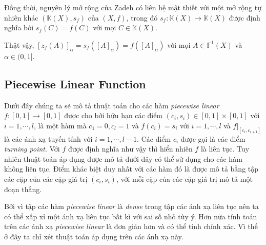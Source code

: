 \documentclass[../report.tex]{subfiles}
\begin{document}
Đồng thời, nguyên lý mở rộng của Zadeh có liên hệ mật thiết với 
một mở rộng tự nhiên khác $(\mathbb{K}(X), s_f)$ của $(X, f)$, trong đó
$s_f: \mathbb{K}(X) \rightarrow \mathbb{K}(X)$ được định nghĩa bởi 
$s_f(C) = f(C)$ với mọi $C \in \mathbb{K}(X)$.

Thật vậy, $[z_f(A)]_{\alpha} = s_f([A]_{\alpha}) = f([A]_{\alpha})$ 
với mọi $A \in \mathbb{F}^1(X)$ và $\alpha \in (0, 1]$.

\subsection{Piecewise Linear Function}
Dưới đây chúng ta sẽ mô tả thuật toán cho các hàm \textit{piecewise linear}
$f: [0, 1] \rightarrow [0, 1]$ được cho bởi hữu hạn các điểm
$(c_i, s_i) \in [0, 1] \times [0, 1]$ với $i = 1,\cdots, l$, là một 
hàm mà $c_1 = 0, c_l = 1$ và $f(c_i) = s_i$ với $i = 1, \cdots, l$ và 
$f|_{[c_i, c_{i + 1}]}$ là các ánh xạ tuyến tính với $i = 1, \cdots, l - 1$.
Các điểm $c_i$ được gọi là các điểm \textit{turning point}. Với $f$ được định nghĩa như vậy thì hiển nhiên $f$ là liên tục. Tuy nhiên thuật toán áp 
dụng được mô tả dưới đây có thể sử dụng cho các hàm không liên tục. Điểm 
khác biệt duy nhất với các hàm đó là được mô tả bằng tập các cặp của các 
cặp giá trị $(c_i, s_i)$, với mỗi cặp của các cặp giá trị mô tả một 
đoạn thẳng. 

Bởi vì tập các hàm \textit{piecewise linear} là \textit{dense} trong tập 
các ánh xạ liên tục nên ta có thể xấp xỉ một ánh xạ liên tục bất kì với 
sai số nhỏ tùy ý. Hơn nữa tính toán trên các ánh xạ 
\textit{piecewise linear} là đơn giản hơn và có thể tính chính xác. Vì thế ở đây ta chỉ xét 
thuật toán áp dụng trên các ánh xạ này. 
\end{document}
